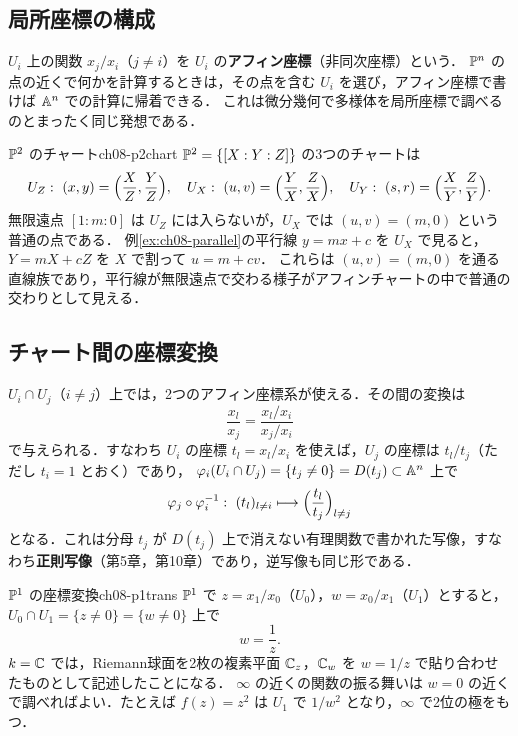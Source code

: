 \subsection{局所座標の構成}

$U_i$ 上の関数 $x_j/x_i$（$j\neq i$）を $U_i$ の\textbf{アフィン座標}（非同次座標）という．
$\mathbb{P}^n$ の点の近くで何かを計算するときは，その点を含む $U_i$ を選び，アフィン座標で書けば $\mathbb{A}^n$ での計算に帰着できる．
これは微分幾何で多様体を局所座標で調べるのとまったく同じ発想である．

\begin{myex}{$\mathbb{P}^2$ のチャート}{ch08-p2chart}
$\mathbb{P}^2=\{[X:Y:Z]\}$ の3つのチャートは
\[
  U_Z:\ (x,y)=\Bigl(\frac XZ,\frac YZ\Bigr),\quad
  U_X:\ (u,v)=\Bigl(\frac YX,\frac ZX\Bigr),\quad
  U_Y:\ (s,r)=\Bigl(\frac XY,\frac ZY\Bigr).
\]
無限遠点 $[1:m:0]$ は $U_Z$ には入らないが，$U_X$ では $(u,v)=(m,0)$ という普通の点である．
例\ref{ex:ch08-parallel}の平行線 $y=mx+c$ を $U_X$ で見ると，$Y=mX+cZ$ を $X$ で割って $u=m+cv$．
これらは $(u,v)=(m,0)$ を通る直線族であり，平行線が無限遠点で交わる様子がアフィンチャートの中で普通の交わりとして見える．
\end{myex}

\subsection{チャート間の座標変換}

$U_i\cap U_j$（$i\neq j$）上では，2つのアフィン座標系が使える．その間の変換は
\[
  \frac{x_l}{x_j}=\frac{x_l/x_i}{x_j/x_i}
\]
で与えられる．すなわち $U_i$ の座標 $t_l=x_l/x_i$ を使えば，$U_j$ の座標は $t_l/t_j$（ただし $t_i=1$ とおく）であり，
$\varphi_i(U_i\cap U_j)=\{t_j\neq0\}=D(t_j)\subset\mathbb{A}^n$ 上で
\[
  \varphi_j\circ\varphi_i^{-1}:\ (t_l)_{l\ne i}\longmapsto\Bigl(\frac{t_l}{t_j}\Bigr)_{l\neq j}
\]
となる．これは分母 $t_j$ が $D(t_j)$ 上で消えない有理関数で書かれた写像，すなわち\textbf{正則写像}（第5章，第10章）であり，逆写像も同じ形である．

\begin{myex}{$\mathbb{P}^1$ の座標変換}{ch08-p1trans}
$\mathbb{P}^1$ で $z=x_1/x_0$（$U_0$），$w=x_0/x_1$（$U_1$）とすると，$U_0\cap U_1=\{z\neq0\}=\{w\neq0\}$ 上で
\[
  w=\frac1z.
\]
$k=\mathbb{C}$ では，Riemann球面を2枚の複素平面 $\mathbb{C}_z$，$\mathbb{C}_w$ を $w=1/z$ で貼り合わせたものとして記述したことになる．
$\infty$ の近くの関数の振る舞いは $w=0$ の近くで調べればよい．たとえば $f(z)=z^2$ は $U_1$ で $1/w^2$ となり，$\infty$ で2位の極をもつ．
\end{myex}

